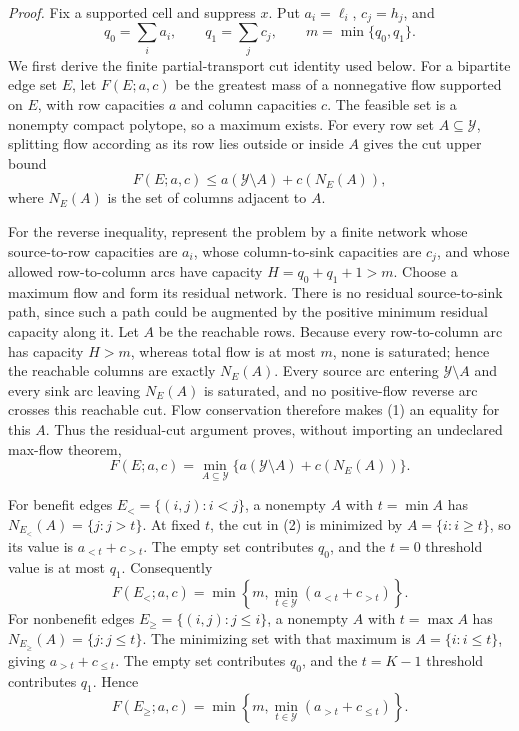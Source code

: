 \noindent\textit{Proof.}
Fix a supported cell and suppress \(x\).  Put \(a_i=\ell_i\),
\(c_j=h_j\), and
\[
q_0=\sum_i a_i,\qquad q_1=\sum_jc_j,
\qquad m=\min\{q_0,q_1\}.
\]
We first derive the finite partial-transport cut identity used below.  For
a bipartite edge set \(E\), let \(F(E;a,c)\) be the greatest mass of a
nonnegative flow supported on \(E\), with row capacities \(a\) and column
capacities \(c\).  The feasible set is a nonempty compact polytope, so a
maximum exists.  For every row set \(A\subseteq\mathcal Y\), splitting
flow according as its row lies outside or inside \(A\) gives the cut
upper bound
\[
F(E;a,c)\le a(\mathcal Y\setminus A)+c(N_E(A)),
\tag{1}
\]
where \(N_E(A)\) is the set of columns adjacent to \(A\).

For the reverse inequality, represent the problem by a finite network
whose source-to-row capacities are \(a_i\), whose column-to-sink
capacities are \(c_j\), and whose allowed row-to-column arcs have capacity
\(H=q_0+q_1+1>m\).  Choose a maximum flow and form its residual network.
There is no residual source-to-sink path, since such a path could be
augmented by the positive minimum residual capacity along it.  Let \(A\)
be the reachable rows.  Because every row-to-column arc has capacity
\(H>m\), whereas total flow is at most \(m\), none is saturated; hence
the reachable columns are exactly \(N_E(A)\).  Every source arc entering
\(\mathcal Y\setminus A\) and every sink arc leaving \(N_E(A)\) is
saturated, and no positive-flow reverse arc crosses this reachable cut.
Flow conservation therefore makes (1) an equality for this \(A\).  Thus
the residual-cut argument proves, without importing an undeclared
max-flow theorem,
\[
F(E;a,c)=\min_{A\subseteq\mathcal Y}
\{a(\mathcal Y\setminus A)+c(N_E(A))\}.
\tag{2}
\]

For benefit edges \(E_{<}=\{(i,j):i<j\}\), a nonempty \(A\) with
\(t=\min A\) has \(N_{E_<}(A)=\{j:j>t\}\).  At fixed \(t\), the cut in
(2) is minimized by \(A=\{i:i\ge t\}\), so its value is
\(a_{<t}+c_{>t}\).  The empty set contributes \(q_0\), and the
\(t=0\) threshold value is at most \(q_1\).  Consequently
\[
F(E_<;a,c)=
\min\left\{m,\min_{t\in\mathcal Y}(a_{<t}+c_{>t})\right\}.
\tag{3}
\]
For nonbenefit edges \(E_{\ge}=\{(i,j):j\le i\}\), a nonempty \(A\) with
\(t=\max A\) has \(N_{E_{\ge}}(A)=\{j:j\le t\}\).  The minimizing set
with that maximum is \(A=\{i:i\le t\}\), giving
\(a_{>t}+c_{\le t}\).  The empty set contributes \(q_0\), and the
\(t=K-1\) threshold contributes \(q_1\).  Hence
\[
F(E_{\ge};a,c)=
\min\left\{m,\min_{t\in\mathcal Y}(a_{>t}+c_{\le t})\right\}.
\tag{4}
\]

